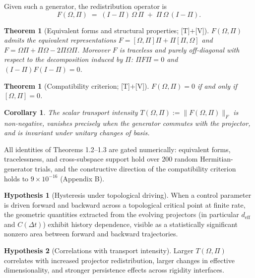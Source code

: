 \documentclass[11pt]{article}
\theoremstyle{definition}
\newtheorem{hypothesis}{Hypothesis}
\theoremstyle{plain}
\newtheorem{theorem}[definition]{Theorem}
\newtheorem{corollary}[definition]{Corollary}
\begin{document}
Given such a generator, the redistribution operator is
\begin{equation}
F(\Omega,\Pi) \;=\; (I-\Pi)\,\Omega\,\Pi \;+\; \Pi\,\Omega\,(I-\Pi).
\end{equation}

\begin{theorem}[Equivalent forms and structural properties; {[T]}$+${[V]}]
$F(\Omega,\Pi)$ admits the equivalent representations
$F = [\Omega,\Pi]\Pi + \Pi[\Pi,\Omega]$ and
$F = \Omega\Pi + \Pi\Omega - 2\Pi\Omega\Pi$. Moreover $F$ is traceless and purely
off-diagonal with respect to the decomposition induced by $\Pi$:
$\Pi F \Pi = 0$ and $(I-\Pi)F(I-\Pi) = 0$.
\end{theorem}

\begin{theorem}[Compatibility criterion; {[T]}$+${[V]}]
$F(\Omega,\Pi) = 0$ if and only if $[\Omega,\Pi] = 0$.
\end{theorem}

\begin{corollary}
The scalar transport intensity $T(\Omega,\Pi) := \|F(\Omega,\Pi)\|_F$ is
non-negative, vanishes precisely when the generator commutes with the projector,
and is invariant under unitary changes of basis.
\end{corollary}

All identities of Theorems 1.2--1.3 are gated numerically: equivalent forms,
tracelessness, and cross-subspace support hold over 200 random Hermitian-generator
trials, and the constructive direction of the compatibility criterion holds to
$9 \times 10^{-16}$ (Appendix B).

\begin{hypothesis}[Hysteresis under topological driving]
When a control parameter is driven forward and backward across a topological
critical point at finite rate, the geometric quantities extracted from the evolving
projectors (in particular $d_{\mathrm{eff}}$ and $C(\Delta t)$) exhibit history
dependence, visible as a statistically significant nonzero area between forward and
backward trajectories.
\end{hypothesis}

\begin{hypothesis}[Correlations with transport intensity]
Larger $T(\Omega,\Pi)$ correlates with increased projector redistribution, larger
changes in effective dimensionality, and stronger persistence effects across
rigidity interfaces.
\end{hypothesis}
\end{document}
